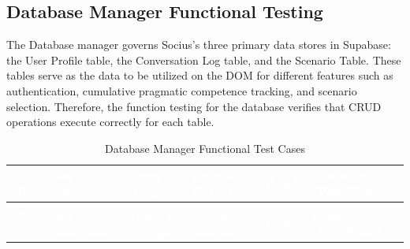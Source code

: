 \subsection{Database Manager Functional Testing}
 
  The Database manager governs Socius's three primary data stores in Supabase: the User Profile table, the Conversation Log table, and the Scenario Table. These tables serve as
the data to be utilized on the DOM for different features such as authentication, cumulative pragmatic competence tracking, and scenario selection. Therefore, the function testing for the database verifies that CRUD
operations execute correctly for each table. 
 
\begin{longtable}{>{\bfseries}p{1.2cm} p{3.0cm} p{3.5cm} p{4.5cm} p{1.0cm} p{1.5cm}}
\caption{Database Manager Functional Test Cases}
\label{tab:tc-db} \\
 
\rowcolor{headerblue}
\textcolor{white}{\textbf{TC-DB}} &
\textcolor{white}{\textbf{Test Description}} &
\textcolor{white}{\textbf{Input / Trigger}} &
\textcolor{white}{\textbf{Expected Output}} &
\textcolor{white}{\textbf{Result}} &
\textcolor{white}{\textbf{Stress Test (Pass/Total)}} \\
\endfirsthead
 
\multicolumn{6}{c}{\tablename\ \thetable{} -- continued} \\
\rowcolor{headerblue}
\textcolor{white}{\textbf{TC-DB}} &
\textcolor{white}{\textbf{Test Description}} &
\textcolor{white}{\textbf{Input / Trigger}} &
\textcolor{white}{\textbf{Expected Output}} &
\textcolor{white}{\textbf{Result}} &
\textcolor{white}{\textbf{Stress Test (Pass/Total)}} \\
\endhead
 

\end{longtable}
